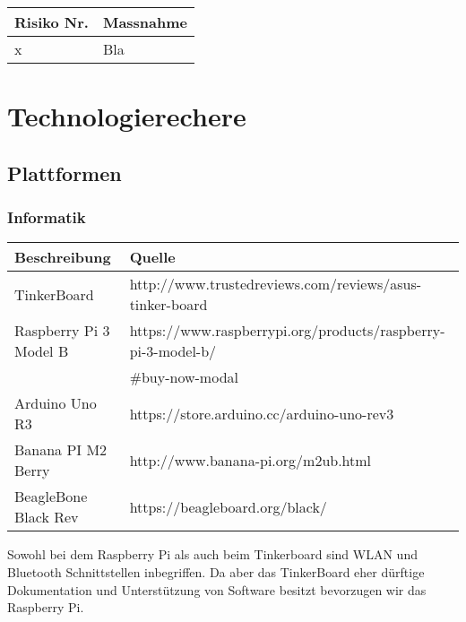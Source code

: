 \documentclass[a4paper]{report}
\begin{document}
\vspace{1em}
\noindent
\begin{tabular}{|l|l|}
	\hline 
	\textbf{Risiko Nr.} & \textbf{Massnahme} \\
	\hline
	x & Bla \\
	\hline
\end{tabular}

\chapter{Technologierechere}

\section{Plattformen}

\subsection{Informatik}
\vspace{1em}
\noindent
\begin{tabular}{|l|l|}
	\hline 
	\textbf{Beschreibung} & \textbf{Quelle} \\
	\hline
	TinkerBoard & http://www.trustedreviews.com/reviews/asus-tinker-board \\
	\hline
	Raspberry Pi 3 Model B & https://www.raspberrypi.org/products/raspberry-pi-3-model-b/\\
	&\#buy-now-modal \\
	\hline
	Arduino Uno R3 & https://store.arduino.cc/arduino-uno-rev3\\
	\hline
	Banana PI M2 Berry & http://www.banana-pi.org/m2ub.html \\
	\hline
	BeagleBone Black Rev & https://beagleboard.org/black/\\
	\hline
\end{tabular}

\vspace{1em}
Sowohl bei dem Raspberry Pi als auch beim Tinkerboard sind WLAN und Bluetooth Schnittstellen inbegriffen. Da aber das TinkerBoard eher dürftige Dokumentation und Unterstützung von Software besitzt \parencite[Fazit]{Finnamore2017} bevorzugen wir das Raspberry Pi.
\end{document}
